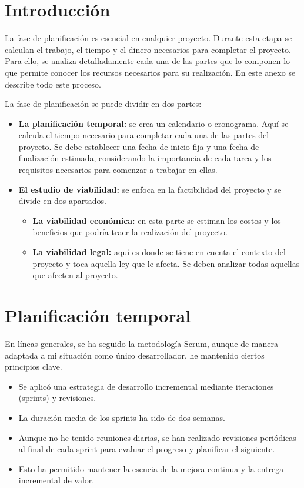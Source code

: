 
\section{Introducción}\label{plan-proyecto-introduccion}

La fase de planificación es esencial en cualquier proyecto. Durante esta etapa se calculan el trabajo, el tiempo y el dinero necesarios para completar el proyecto. Para ello, se analiza detalladamente cada una de las partes que lo componen lo que permite conocer los recursos necesarios para su realización. En este anexo se describe todo este proceso.

La fase de planificación se puede dividir en dos partes:

\begin{itemize}
  \item \textbf{La planificación temporal:} se crea un calendario o cronograma. Aquí se calcula el tiempo necesario para completar cada una de las partes del proyecto. Se debe establecer una fecha de inicio fija y una fecha de finalización estimada, considerando la importancia de cada tarea y los requisitos necesarios para comenzar a trabajar en ellas.
  \item \textbf{El estudio de viabilidad:} se enfoca en la factibilidad del proyecto y se divide en dos apartados. 
  \begin{itemize}
    \item \textbf{La viabilidad económica:} en esta parte se estiman los costos y los beneficios que podría traer la realización del proyecto. 
    \item \textbf{La viabilidad legal:} aquí es donde se tiene en cuenta el contexto del proyecto y toca aquella ley que le afecta. Se deben analizar todas aquellas que afecten al proyecto.
  \end{itemize}
\end{itemize}

\section{Planificación temporal}\label{planificacion-temporal}

En líneas generales, se ha seguido la metodología Scrum, aunque de manera adaptada a mi situación como único desarrollador, he mantenido ciertos principios clave.

\begin{itemize}
  \item Se aplicó una estrategia de desarrollo incremental mediante iteraciones (sprints) y revisiones.
  \item La duración media de los sprints ha sido de dos semanas.
  \item Aunque no he tenido reuniones diarias, se han realizado revisiones periódicas al final de cada sprint para evaluar el progreso y planificar el siguiente.
  \item Esto ha permitido mantener la esencia de la mejora continua y la entrega incremental de valor.
\end{itemize}

